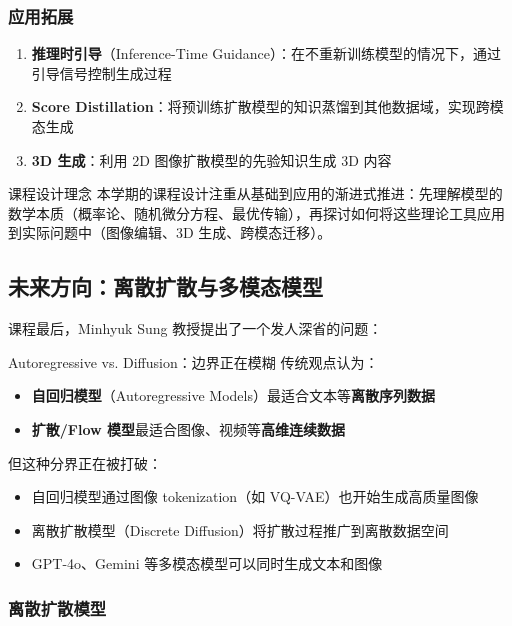 \documentclass[a4paper]{article}
\begin{document}
\subsubsection{应用拓展}

\begin{enumerate}
    \item \textbf{推理时引导}（Inference-Time Guidance）：在不重新训练模型的情况下，通过引导信号控制生成过程
    \item \textbf{Score Distillation}：将预训练扩散模型的知识蒸馏到其他数据域，实现跨模态生成
    \item \textbf{3D 生成}：利用 2D 图像扩散模型的先验知识生成 3D 内容
\end{enumerate}

\begin{importantbox}{课程设计理念}
本学期的课程设计注重从基础到应用的渐进式推进：先理解模型的数学本质（概率论、随机微分方程、最优传输），再探讨如何将这些理论工具应用到实际问题中（图像编辑、3D 生成、跨模态迁移）。
\end{importantbox}

\subsection{未来方向：离散扩散与多模态模型}

课程最后，Minhyuk Sung 教授提出了一个发人深省的问题：

\begin{importantbox}{Autoregressive vs. Diffusion：边界正在模糊}
传统观点认为：
\begin{itemize}
    \item \textbf{自回归模型}（Autoregressive Models）最适合文本等\textbf{离散序列数据}
    \item \textbf{扩散/Flow 模型}最适合图像、视频等\textbf{高维连续数据}
\end{itemize}

但这种分界正在被打破：
\begin{itemize}
    \item 自回归模型通过图像 tokenization（如 VQ-VAE）也开始生成高质量图像
    \item 离散扩散模型（Discrete Diffusion）将扩散过程推广到离散数据空间
    \item GPT-4o、Gemini 等多模态模型可以同时生成文本和图像
\end{itemize}
\end{importantbox}

\subsubsection{离散扩散模型}
\end{document}
